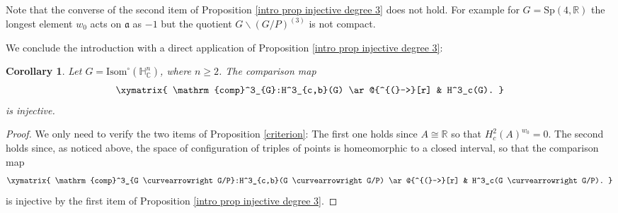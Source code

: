 \documentclass[a4paper]{amsart}
\newtheorem{intro_cor}[intro_thm]{Corollary}
\theoremstyle{definition}
\theoremstyle{remark}
\theoremstyle{TheoremNum}
\begin{document}
Note that the converse of the second item of Proposition \ref{intro prop injective degree 3} does not hold. For example for $G=\mathrm{Sp}(4,\mathbb{R})$ the longest element $w_0$ acts on $\mathfrak{a}$ as $-1$ but the quotient $G\backslash (G/P)^{(3)}$ is not compact. 

We conclude the introduction with a direct application of Proposition \ref{intro prop injective degree 3}: 

\begin{intro_cor}\label{cor complex}
Let $G=\mathrm{Isom}^\circ(\mathbb{H}^n_{\mathbb{C}})$, where $n \geq 2$. The comparison map
$$
\xymatrix{
\mathrm{comp}^3_{G}:H^3_{c,b}(G) \ar@{^{(}->}[r] & H^3_c(G).
}
$$
is injective. 
\end{intro_cor}

\begin{proof} We only need to verify the two items of Proposition \ref{criterion}: The first one holds since $A\cong \mathbb{R}$ so that $H^2_c(A)^{w_0}=0$. The second holds since, as noticed above, the space of configuration of triples of points is homeomorphic to a closed interval, so that the comparison map 
$$
\xymatrix{
\mathrm{comp}^3_{G \curvearrowright G/P}:H^3_{c,b}(G \curvearrowright G/P) \ar@{^{(}->}[r] & H^3_c(G \curvearrowright G/P).
}
$$
is injective by the first item of Proposition \ref{intro prop injective degree 3}. 
\end{proof}
\end{document}
